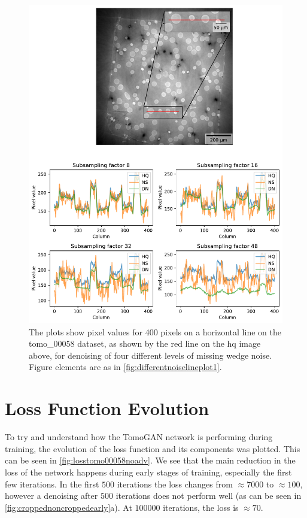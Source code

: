 \begin{figure}[htbp]
  \centering
  \includegraphics[width=.95\textwidth]{figures/differentnoiselineplot2.pdf}
  \caption[Pixel value plot of denoising of different levels of noise on tomo\_00058]{The plots show pixel values for 400 pixels on a horizontal line on the tomo\_00058 dataset, as shown by the red line on the \gls{hq} image above, for denoising of four different levels of missing wedge noise. Figure elements are as in \cref{fig:differentnoiselineplot1}. }
  \label{fig:differentnoiselineplot2}
\end{figure}

\section{Loss Function Evolution}
To try and understand how the TomoGAN network is performing during training, the evolution of the loss function and its components was plotted. This can be seen in \cref{fig:losstomo00058noadv}. We see that the main reduction in the loss of the network happens during early stages of training, especially the first few iterations. In the first $500$ iterations the loss changes from $\approx 7000$ to $\approx 100$, however a denoising after $500$ iterations does not perform well (as can be seen in \cref{fig:croppednoncroppedearly}a). At $100000$ iterations, the loss is $\approx 70$. 

